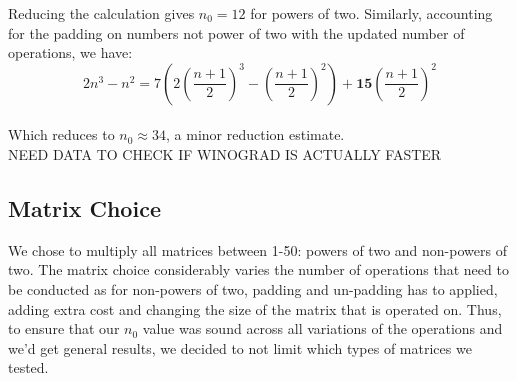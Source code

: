 \documentclass[11pt]{scrartcl}
\theoremstyle{dotlessP}
\theoremstyle{dotlessN}
\theoremstyle{dotN}
\begin{document}
Reducing the calculation gives $n_0 = 12$ for powers of two. 
Similarly, accounting for the padding on numbers not power of two with the updated number of operations, we have: 
\[2n^3 - n^2 = 7(2(\frac{n+1}{2})^3-(\frac{n+1}{2})^2)+\textbf{15}(\frac{n+1}{2})^2\]\\

Which reduces to $n_0 \approx 34$, a minor reduction estimate.\\

NEED DATA TO CHECK IF WINOGRAD IS ACTUALLY FASTER 

\subsection{Matrix Choice}
We chose to multiply all matrices between 1-50: powers of two and non-powers of two. The matrix choice considerably varies the number of operations that need to be conducted as for non-powers of two, padding and un-padding has to applied, adding extra cost and changing the size of the matrix that is operated on. Thus, to ensure that our $n_0$ value was sound across all variations of the operations and we'd get general results, we decided to not limit which types of matrices we tested. 
\end{document}
